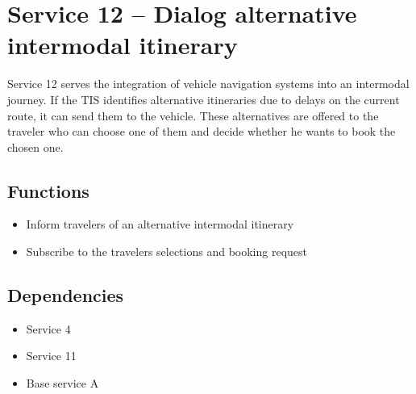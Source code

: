 \section{Service 12 -- Dialog alternative intermodal itinerary}
Service 12 serves the integration of vehicle navigation systems into an intermodal journey.
If the TIS identifies alternative itineraries due to delays on the current route, it can send them to the vehicle.
These alternatives are offered to the traveler who can choose one of them and decide whether he wants to book the chosen one.

\subsection*{Functions}
\begin{itemize}
\item Inform travelers of an alternative intermodal itinerary
\item Subscribe to the travelers selections and booking request
\end{itemize}

\subsection*{Dependencies}
\begin{itemize}
\item Service 4
\item Service 11
\item Base service A
\end{itemize}

